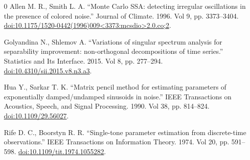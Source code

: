 \documentclass{article}
\begin{document}
\begin{thebibliography}{0}
 Allen M. R., Smith L. A. ``Monte Carlo SSA: detecting irregular oscillations in the presence of colored noise.'' Journal of Climate. 1996. Vol 9, pp. 3373--3404. \href{https://doi.org/10.1175/1520-0442(1996)009<3373:mcsdio>2.0.co;2}{doi:10.1175/1520-0442(1996)009<3373:mcsdio>2.0.co;2}.

 Golyandina N., Shlemov A. ``Variations of singular spectrum analysis for separability improvement: non-orthogonal decompositions of time series.'' Statistics and Its Interface. 2015. Vol 8, pp. 277--294. \href{https://doi.org/10.4310/sii.2015.v8.n3.a3}{doi:10.4310/sii.2015.v8.n3.a3}.

 Hua Y., Sarkar T. K. ``Matrix pencil method for estimating parameters of exponentially damped/undamped sinusoids in noise.'' IEEE Transactions on Acoustics, Speech, and Signal Processing. 1990. Vol 38, pp. 814--824. \href{https://doi.org/10.1109/29.56027}{doi:10.1109/29.56027}.

 Rife D. C., Boorstyn R. R. ``Single-tone parameter estimation from discrete-time observations.'' IEEE Transactions on Information Theory. 1974. Vol 20, pp. 591--598. \href{https://doi.org/10.1109/tit.1974.1055282}{doi:10.1109/tit.1974.1055282}.


\end{thebibliography}
\end{document}
